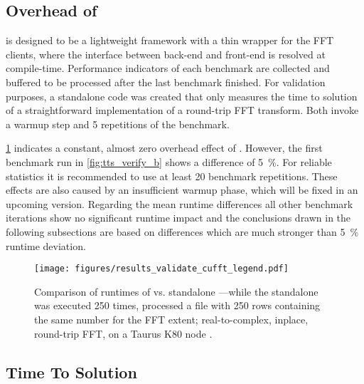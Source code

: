 
\subsection{Overhead of \gearshifft{}}
\gearshifft{} is designed to be a lightweight framework with a thin wrapper for the FFT clients, where the interface between back-end and front-end is resolved at compile-time. Performance indicators of each benchmark are collected and buffered to be processed after the last benchmark finished. For validation purposes, a \cufft{} standalone code \cite{gearshifft_github} was created that only measures the time to solution of a straightforward implementation of a round-trip FFT transform. Both invoke a warmup step and 5 repetitions of the benchmark. 

\cref{fig:verify_cufft} indicates a constant, almost zero overhead effect of \gearshifft{}.
However, the first benchmark run in \cref{fig:tts_verify_b} shows a difference of \SI{5}{\percent}. For reliable statistics it is recommended to use at least 20 benchmark repetitions.
These effects are also caused by an insufficient warmup phase, which will be fixed in an upcoming \gearshifft{} version. 
Regarding the mean runtime differences all other benchmark iterations show no significant runtime impact and the conclusions drawn in the following subsections are based on differences which are much stronger than \SI{5}{\percent} runtime deviation.

\begin{figure}[!htbp]
\vspace{-1em}
  \centering
  \texttt{[image: figures/results\_validate\_cufft\_legend.pdf]}\vspace{-1em}
  \hfill
  \caption{Comparison of runtimes of \gearshifft{} vs. standalone \cufft{}---while the standalone \cufft{} was executed 250 times, \gearshifft{} processed a file with 250 rows containing the same number for the FFT extent; real-to-complex, inplace, round-trip FFT, on a Taurus K80 node \cite{taurus}.}
  \label{fig:verify_cufft}
\end{figure}

\subsection{Time To Solution}
\label{ssec:tts}


